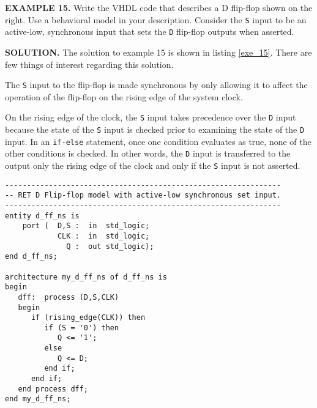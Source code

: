 \begin{leftbar}
\begin{minipage}{0.5\linewidth}
\noindent
\textbf{EXAMPLE 15.}
Write the VHDL code that describes a D flip-flop shown on the right. Use a behavioral model in your description. Consider the \texttt{S} input to be an active-low, synchronous input that sets the \texttt{D} flip-flop outputs when asserted.
\end{minipage}
\begin{minipage}{0.47\linewidth}
\begin{flushright}
\end{flushright}
\end{minipage}
\end{leftbar}
\noindent
\textbf{SOLUTION.} The solution to example 15 is shown in listing \ref{exe_15}. There are few things of interest regarding this solution.
\begin{my_list}
\item The \texttt{S} input to the flip-flop is made synchronous by only allowing it to affect the operation of the flip-flop on the rising edge of the system clock. 
\item On the rising edge of the clock, the \texttt{S} input takes precedence over the \texttt{D} input because the state of the \texttt{S} input is checked prior to examining the state of the \texttt{D} input. In an \texttt{if-else} statement, once one condition evaluates as true, none of the other conditions is checked. In other words, the \texttt{D} input is transferred to the output only the rising edge of the clock and only if the \texttt{S} input is not asserted.
\end{my_list}
\begin{lstlisting}[label=exe_15, caption=Solution to example 15.]
---------------------------------------------------------------
-- RET D Flip-flop model with active-low synchronous set input.
---------------------------------------------------------------
entity d_ff_ns is 
    port (  D,S :  in  std_logic; 
            CLK :  in  std_logic; 
              Q :  out std_logic); 
end d_ff_ns;

architecture my_d_ff_ns of d_ff_ns is 
begin
   dff:  process (D,S,CLK)
   begin
      if (rising_edge(CLK)) then
         if (S = '0') then
            Q <= '1';
         else
            Q <= D;
         end if;
      end if;
   end process dff;
end my_d_ff_ns;
\end{lstlisting}

